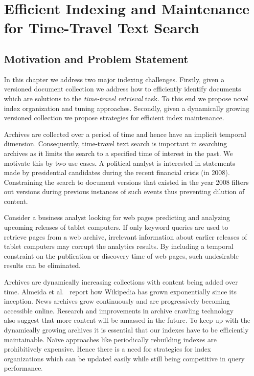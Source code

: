 \chapter{Efficient Indexing and Maintenance for Time-Travel Text Search}
\label{chap:sharding}

\section{Motivation and Problem Statement}
In this chapter we address two major indexing challenges. Firstly, 
given a versioned document collection we address how to efficiently 
identify documents which are solutions to the \emph{time-travel 
retrieval} task. To this end we propose novel index organization and tuning approaches. Secondly, given a dynamically growing versioned 
collection we propose strategies for efficient index maintenance.

Archives are collected over a period of time and 
hence have an implicit temporal dimension. Consequently, time-travel text search is important in searching archives as it limits the search to a 
specified time of interest in the past. We motivate this by two use cases. A political analyst is interested in statements made by 
presidential candidates during the recent financial crisis (in 2008). 
Constraining the search to document versions that existed in the year 2008 filters out versions during
previous instances of such events thus preventing dilution of 
content.

Consider a business analyst looking for web pages
predicting and analyzing upcoming releases of tablet computers.  If only keyword
queries are used to retrieve pages from a web archive, irrelevant
information about earlier releases of tablet computers may 
corrupt the analytics results. By including a temporal constraint
on the publication or discovery time of web pages, such undesirable results can be eliminated. 


Archives are dynamically increasing collections with content being 
added over time. Almeida et al.~\cite{Almeida:icwsm07} 
report how Wikipedia has grown exponentially since its inception. News 
archives grow continuously and are progressively becoming 
accessible online. Research and improvements in archive crawling technology~\cite{Denev12, digitalHistory:www} 
also suggest that more content will be amassed in the future. 
To keep up with the dynamically growing archives it is essential that
our indexes have to be efficiently maintainable. Na\"ive 
approaches like periodically rebuilding indexes are prohibitively expensive. 
Hence there is a need for strategies for index organizations which can be 
updated easily while still being competitive in query performance.

